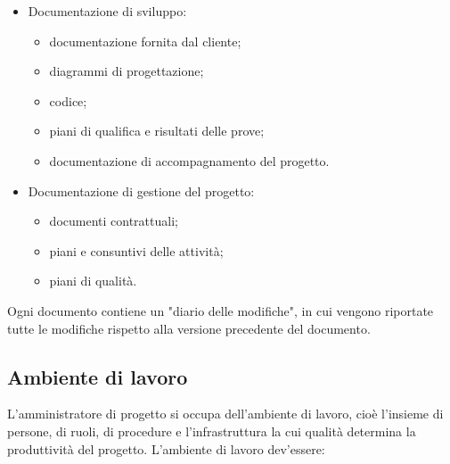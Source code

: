 \documentclass[a4paper]{article}
\begin{document}
	\begin{itemize}
		
			
	\item Documentazione di sviluppo:
				
	\begin{itemize}
		
					
	\item documentazione fornita dal cliente;
					
	\item diagrammi di progettazione;
					
	\item codice;
					
	\item piani di qualifica e risultati delle prove;
					
	\item documentazione di accompagnamento del progetto.
				
	\end{itemize}

			
			
	\item Documentazione di gestione del progetto:
				
	\begin{itemize}
		
					
	\item documenti contrattuali;
					
	\item piani e consuntivi delle attività;
					
	\item piani di qualità.
				
	\end{itemize}

			
		
	\end{itemize}

		
Ogni documento contiene un "diario delle modifiche", in cui vengono riportate tutte le modifiche rispetto alla versione precedente del documento.

		
	\subsection{Ambiente di lavoro}

		
L'amministratore di progetto si occupa dell'ambiente di lavoro, cioè l'insieme di persone, di ruoli, di procedure e l'infrastruttura la cui qualità determina la produttività del progetto. L'ambiente di lavoro dev'essere:
		
\end{document}
